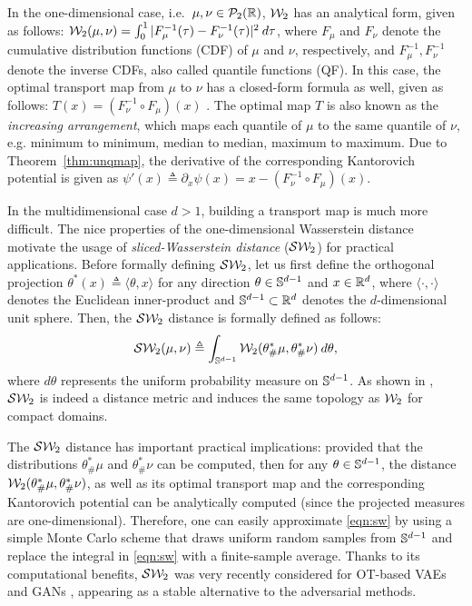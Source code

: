 %
In the one-dimensional case, i.e.\ $\mu,\nu \in {\cal P}_2(\mathbb{R})$, ${\cal W}_2$ has an analytical form, given as follows:
${\cal W}_2(\mu,\nu) = \int_0^1 |F_\mu^{-1}(\tau) - F_\nu^{-1}(\tau)|^2 \> d\tau$, %
where $F_\mu$ and $F_\nu$ denote the cumulative distribution functions (CDF) of $\mu$ and $\nu$, respectively, and $F^{-1}_\mu, F^{-1}_\nu$ denote the inverse CDFs, also called quantile functions (QF).
%
In this case, the optimal transport map from $\mu$ to $\nu$  has a closed-form formula as well, given as follows: $T(x) = (F_\nu^{-1} \circ F_\mu) (x)$ \cite{villani2008optimal}. The optimal map $T$ is also known as the \emph{increasing arrangement}, which maps each quantile of $\mu$ to the same quantile of $\nu$, e.g. minimum to minimum, median to median, maximum to maximum.
%
Due to Theorem~\ref{thm:unqmap}, the derivative of the corresponding Kantorovich potential is given as $\psi'(x) \triangleq \partial_x \psi(x) = x- (F_\nu^{-1} \circ F_\mu) (x)$.

In the multidimensional case $d > 1$, building a transport map is much more difficult. The nice properties of the one-dimensional Wasserstein distance motivate the usage of \emph{sliced-Wasserstein distance} (${\cal S}{\cal W}_2$) for practical applications. Before formally defining ${\cal S}{\cal W}_2$, let us first define the orthogonal projection $\theta^* (x) \triangleq \langle \theta, x \rangle$ for any direction $\theta \in \mathbb{S}^{d-1}$ and $x \in \mathbb{R}^d$, where $\langle \cdot, \cdot \rangle$ denotes the Euclidean inner-product and $\mathbb{S}^{d-1} \subset \mathbb{R}^d$ denotes the $d$-dimensional unit sphere. Then, the ${\cal S}{\cal W}_2$ distance is formally defined as follows:
\begin{align}
{\cal S}{\cal W}_2(\mu,\nu) \triangleq \int_{\mathbb{S}^{d-1}} {\cal W}_2 (\theta^*_\#\mu, \theta^*_\#\nu) \> d \theta, \label{eqn:sw}
\end{align}
where $d\theta$ represents the uniform probability measure on $\mathbb{S}^{d-1}$. As shown in \cite{bonnotte2013unidimensional}, ${\cal S}{\cal W}_2$ is indeed a distance metric and induces the same topology as ${\cal W}_2$ for compact domains.

The ${\cal S}{\cal W}_2$ distance has important practical implications: provided that the distributions $\theta^*_\#\mu$ and $\theta^*_\#\nu$ can be computed, then for any $\theta \in \mathbb{S}^{d-1}$, the distance ${\cal W}_2 (\theta^*_\#\mu, \theta^*_\#\nu)$, as well as its optimal transport map and the corresponding Kantorovich potential can be analytically computed (since the projected measures are one-dimensional). Therefore, one can easily approximate \eqref{eqn:sw} by using a simple Monte Carlo scheme that draws uniform random samples from $\mathbb{S}^{d-1}$ and replace the integral in \eqref{eqn:sw} with a finite-sample average. Thanks to its computational benefits, ${\cal S}{\cal W}_2$ was very recently considered for OT-based VAEs and GANs \cite{deshpande2018generative,autotranspoter,kolouri2018sliced}, appearing as a stable alternative to the adversarial methods. 




